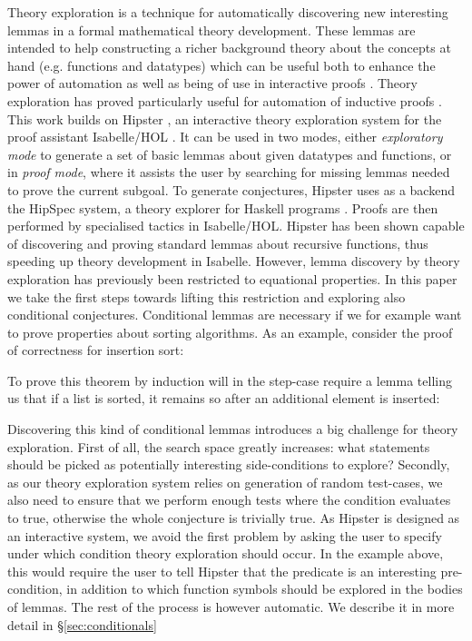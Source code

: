 \label{sec:intro}

Theory exploration is a technique for automatically discovering new interesting lemmas in a formal mathematical theory development.
%
These lemmas are intended to help constructing a richer background theory about the concepts at hand (e.g. functions and datatypes) which can be useful both to enhance the power of automation as well as being of use in interactive proofs \cite{mathsaid,isacosy,isascheme}.
%
Theory exploration has proved particularly useful for automation of inductive proofs \cite{hipspecCADE}. This work builds on Hipster \cite{hipster}, an interactive theory exploration system for the proof assistant Isabelle/HOL \cite{isabelle}.
%
It can be used in two modes, either \emph{exploratory mode} to generate a set of basic lemmas about given datatypes and functions, or in \emph{proof mode}, where it assists the user by searching for missing lemmas needed to prove the current subgoal.
%
To generate conjectures, Hipster uses as a backend the HipSpec system, a theory explorer for Haskell programs \cite{hipspecCADE}.
%
Proofs are then performed by specialised tactics in Isabelle/HOL. Hipster has been shown capable of discovering and proving standard lemmas about recursive functions, thus speeding up theory development in Isabelle.
%
However, lemma discovery by theory exploration has previously been restricted to equational properties.
%
In this paper we take the first steps towards lifting this restriction and exploring also conditional conjectures.
%
Conditional lemmas are necessary if we for example want to prove properties about sorting algorithms.
%
As an example, consider the proof of correctness for insertion sort:
%
\begin{center}
\end{center}
%
To prove this theorem by induction will in the step-case require a lemma telling us that if a list is sorted, it remains so after an additional element is inserted:
%
\begin{center}		
\end{center}
%
Discovering this kind of conditional lemmas introduces a big challenge for theory exploration.
%
First of all, the search space greatly increases: what statements should be picked as potentially interesting side-conditions to explore?
%
Secondly, as our theory exploration system relies on generation of random test-cases, we also need to ensure that we perform enough tests where the condition evaluates to true, otherwise the whole conjecture is trivially true.
%
As Hipster is designed as an interactive system, we avoid the first problem by asking the user to specify under which condition theory exploration should occur.
%
In the example above, this would require the user to tell Hipster that the predicate  is an interesting pre-condition, in addition to which function symbols should be explored in the bodies of lemmas.
%
The rest of the process is however automatic.
%
We describe it in more detail in \S \ref{sec:conditionals} 

